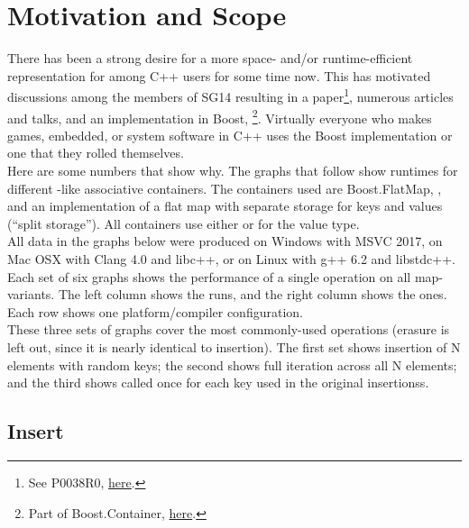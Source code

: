 \section{Motivation and Scope}

There has been a strong desire for a more space- and/or runtime-efficient
representation for  among C++ users for some time now.  This has
motivated discussions among the members of SG14 resulting in a
paper\footnote{See P0038R0,
  \href{http://www.open-std.org/jtc1/sc22/wg21/docs/papers/2015/p0038r0.html}{here}.},
numerous articles and talks, and an implementation in Boost,
\footnote{Part of Boost.Container,
  \href{http://www.boost.org/doc/libs/1_61_0/doc/html/container.html}{here}.}.
Virtually everyone who makes games, embedded, or system software in C++ uses
the Boost implementation or one that they rolled themselves.\\

Here are some numbers that show why.  The graphs that follow show runtimes for
different -like associative containers.  The containers used are
Boost.FlatMap, , and an implementation of a flat map with separate
 storage for keys and values (``split storage'').  All containers
use either  or 
for the value type.\\

All data in the graphs below were produced on Windows with MSVC 2017, on
Mac OSX with Clang 4.0 and libc++, or on Linux with g++ 6.2 and libstdc++.\\

Each set of six graphs shows the performance of a single operation on all
map-variants.  The left column shows the  runs, and the right
column shows the  ones.  Each row shows one
platform/compiler configuration. \\

These three sets of graphs cover the most commonly-used operations (erasure is
left out, since it is nearly identical to insertion).  The first set shows
insertion of N elements with random keys; the second shows full iteration
across all N elements; and the third shows  called
once for each key used in the original insertionss.\\

\subsection{Insert}

